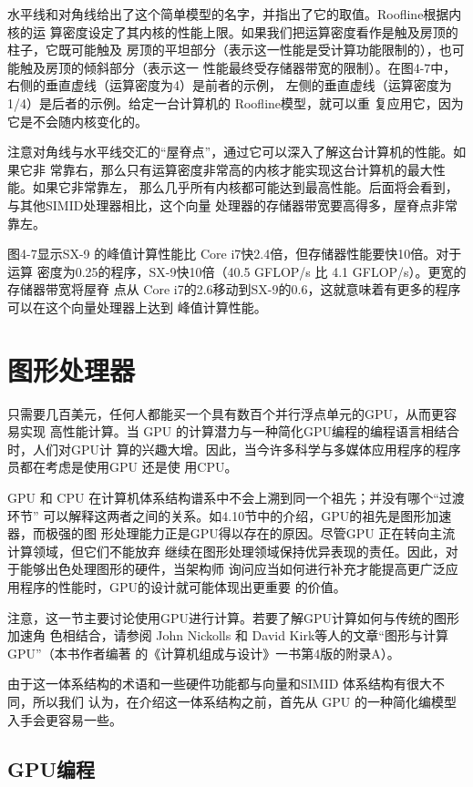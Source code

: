 水平线和对角线给出了这个简单模型的名字，并指出了它的取值。Roofline根据内核的运
算密度设定了其内核的性能上限。如果我们把运算密度看作是触及房顶的柱子，它既可能触及
房顶的平坦部分（表示这一性能是受计算功能限制的），也可能触及房顶的倾斜部分（表示这一
性能最终受存储器带宽的限制）。在图4-7中，右侧的垂直虚线（运算密度为4）是前者的示例，
左侧的垂直虚线（运算密度为1/4）是后者的示例。给定一台计算机的 Roofline模型，就可以重
复应用它，因为它是不会随内核变化的。

注意对角线与水平线交汇的“屋脊点”，通过它可以深入了解这台计算机的性能。如果它非
常靠右，那么只有运算密度非常高的内核才能实现这台计算机的最大性能。如果它非常靠左，
那么几乎所有内核都可能达到最高性能。后面将会看到，与其他SIMID处理器相比，这个向量
处理器的存储器带宽要高得多，屋脊点非常靠左。

图4-7显示SX-9 的峰值计算性能比 Core i7快2.4倍，但存储器性能要快10倍。对于运算
密度为0.25的程序，SX-9快10倍（40.5 GFLOP/s 比 4.1 GFLOP/s）。更宽的存储器带宽将屋脊
点从 Core i7的2.6移动到SX-9的0.6，这就意味着有更多的程序可以在这个向量处理器上达到
峰值计算性能。

\section{图形处理器}

只需要几百美元，任何人都能买一个具有数百个并行浮点单元的GPU，从而更容易实现
高性能计算。当 GPU 的计算潜力与一种简化GPU编程的编程语言相结合时，人们对GPU计
算的兴趣大增。因此，当今许多科学与多媒体应用程序的程序员都在考虑是使用GPU 还是使
用CPU。

GPU 和 CPU 在计算机体系结构谱系中不会上溯到同一个祖先；并没有哪个“过渡环节”
可以解释这两者之间的关系。如4.10节中的介绍，GPU的祖先是图形加速器，而极强的图
形处理能力正是GPU得以存在的原因。尽管GPU 正在转向主流计算领域，但它们不能放弃
继续在图形处理领域保持优异表现的责任。因此，对于能够出色处理图形的硬件，当架构师
询问应当如何进行补充才能提高更广泛应用程序的性能时，GPU的设计就可能体现出更重要
的价值。

注意，这一节主要讨论使用GPU进行计算。若要了解GPU计算如何与传统的图形加速角
色相结合，请参阅 John Nickolls 和 David Kirk等人的文章“图形与计算GPU”（本书作者编著
的《计算机组成与设计》一书第4版的附录A）。

由于这一体系结构的术语和一些硬件功能都与向量和SIMID 体系结构有很大不同，所以我们
认为，在介绍这一体系结构之前，首先从 GPU 的一种简化编模型入手会更容易一些。

\subsection{GPU编程}

